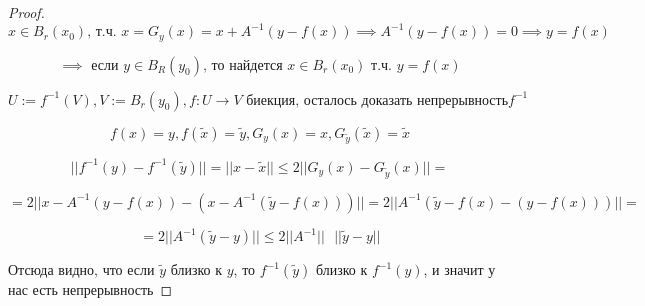 \begin{theorem} 
\begin{proof}
        \[x\in B_{r}(x_{0}) \text{, т.ч. }  x = G_{y}(x) = x+A^{-1}(y-f(x)) \implies A^{-1}(y-f(x))=0 \implies y = f(x)\]
        
        \[\implies \text{ если } y\in B_{R}(y_{0}) \text{, то найдется } x \in B_{r}(x_{0}) \text{ т.ч. } y=f(x)\]
        
        \[U:=f^{-1}(V), V:=B_{r}(y_{0}), f:U\rightarrow V \text{ биекция, осталось доказать непрерывность} f^{-1}\]
        
        \[f(x) = y, f(\tilde{x})=\tilde{y}, G_{y}(x)=x, G_{\tilde{y}}(\tilde{x})=\tilde{x}\]
        
        \[||f^{-1}(y)-f^{-1}(\tilde{y})||=||x-\tilde{x}||\le2||G_{y}(x)-G_{\tilde{y}}(x)|| =  \]
        
        \[= 2||x - A^{-1}(y-f(x))-(x-A^{-1}(\tilde{y}-f(x)))|| = 2 ||A^{-1}(\tilde{y} - f(x) - (y - f(x)))|| =\]
        
        \[= 2||A^{-1}(\tilde{y} - y)|| \le 2||A^{-1}||\text{ }||\tilde{y} - y||\]
        
        Отсюда видно, что если $\tilde{y}$ близко к $y$, то $f^{-1}(\tilde{y})$ близко к $f^{-1}(y)$, и значит у нас есть непрерывность
         
    \end{proof}
    
       
    
   
    
\end{theorem}

